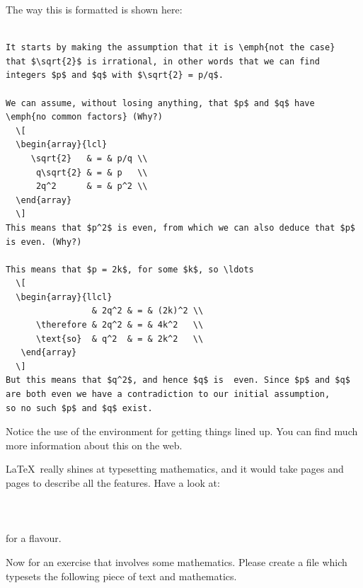 \begin{refsection}
The way this is formatted is shown here:

{\small
\begin{verbatim}

It starts by making the assumption that it is \emph{not the case}
that $\sqrt{2}$ is irrational, in other words that we can find
integers $p$ and $q$ with $\sqrt{2} = p/q$.

We can assume, without losing anything, that $p$ and $q$ have
\emph{no common factors} (Why?)
  \[
  \begin{array}{lcl}
     \sqrt{2}   & = & p/q \\ 
      q\sqrt{2} & = & p   \\ 
      2q^2      & = & p^2 \\ 
  \end{array}
  \]
This means that $p^2$ is even, from which we can also deduce that $p$
is even. (Why?)

This means that $p = 2k$, for some $k$, so \ldots
  \[
  \begin{array}{llcl}
                 & 2q^2 & = & (2k)^2 \\ 
      \therefore & 2q^2 & = & 4k^2   \\ 
      \text{so}  & q^2  & = & 2k^2   \\
   \end{array}
  \]
But this means that $q^2$, and hence $q$ is  even. Since $p$ and $q$
are both even we have a contradiction to our initial assumption,
so no such $p$ and $q$ exist.
\end{verbatim}
}
Notice the use of the  environment for getting things lined up. You can find much more information about this on the web.

  \LaTeX\ really shines at typesetting mathematics, and it would take pages and pages to describe all the features. Have a look at:
\\
\\
\\
\\
for a flavour. 
 
\label{sec:exercise-maths}

 Now for an exercise that involves some mathematics. Please create a file  which typesets the following piece of text and mathematics.
\begin{quote}
  
\end{quote}


\end{refsection}

